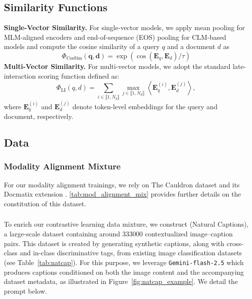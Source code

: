 \subsection{Similarity Functions}
\label{appendix:similarity_functions}
\noindent\textbf{Single-Vector Similarity.}
For single-vector models, we apply mean pooling for MLM-aligned encoders and end-of-sequence (EOS) pooling for CLM-based models and compute the cosine similarity of a query $q$ and a document $d$ as
\begin{equation}
\label{eq:cosine_sim}
    \Phi_\mathrm{CosSim}(\mathbf{q},\mathbf{d}) = \exp(\cos(\mathbf{E}_q,\mathbf{E}_d)/\tau)
\end{equation}
\noindent\textbf{Multi-Vector Similarity.}
For multi-vector models, we adopt the standard late-interaction scoring function defined as:
\begin{equation}
\label{eq:li_sim}
\Phi_\mathrm{LI}(q,d) = \sum_{i \in \llbracket 1, N_q \rrbracket}
\max_{j \in \llbracket 1, N_d \rrbracket}
\left\langle \mathbf{E}_q^{(i)} , \mathbf{E}_d^{(j)} \right\rangle ,
\end{equation}
where $\mathbf{E}_q^{(i)}$ and $\mathbf{E}_d^{(j)}$ denote token-level embeddings for the query and document, respectively.

\subsection{Data}

\subsubsection{Modality Alignment Mixture}
\label{appendix:alignment_mixture}

For our modality alignment trainings, we rely on The Cauldron dataset  and its Docmatix extension . \autoref{tab:mod_alignment_mix} provides further details on the constitution of this dataset.


\subsubsection{\natcap{}}
\label{appendix:natcap}
To enrich our contrastive learning data mixture, we construct \natcap{} (Natural Captions), a large-scale dataset containing around 333000 contextualized image–caption pairs. This dataset is created by generating synthetic captions, along with cross-class and in-class discriminative tags, from existing image classification datasets (see Table~\ref{tab:natcap}). For this purpose, we leverage \texttt{Gemini-flash-2.5} which produces captions conditioned on both the image content and the accompanying dataset metadata, as illustrated in Figure~\ref{fig:natcap_example}. We detail the prompt below.

